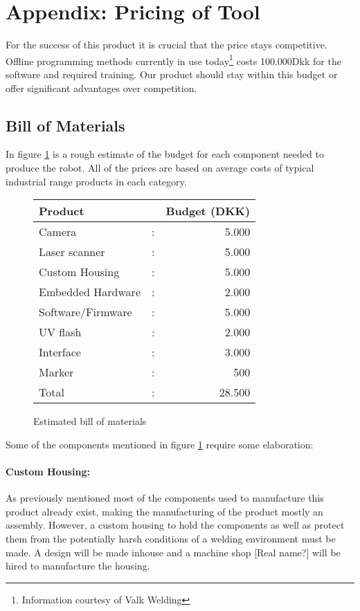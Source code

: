 \section{Appendix: Pricing of Tool}
\label{app:priceofProduct}
For the success of this product it is crucial that the price stays competitive. Offline programming methods currently in use today\footnote{Information courtesy of Valk Welding} costs 100.000Dkk for the software and required training. Our product should stay within this budget or offer significant advantages over competition.
\subsection{Bill of Materials}
In figure \ref{tab:BoM} is a rough estimate of the budget for each component needed to produce the robot. All of the prices are based on average costs of typical industrial range products in each category.  

\begin{figure}[h]
	\begin{center}
		\begin{tabular}{l c r}
		Product            & & Budget (DKK)\\
		\hline
		Camera 				& : & 5.000  \\
		Laser scanner		& : & 5.000 \\
		Custom Housing		& : & 5.000\\
		Embedded Hardware	& : & 2.000\\
		Software/Firmware	& : & 5.000\\
		UV flash			& : & 2.000\\
		Interface			& : & 3.000\\
		Marker				& : & 500\\[0.2cm]
		\hline
		Total				& : & 28.500\\ 
		\end{tabular}
	\end{center}
	\caption{Estimated bill of materials}
\label{tab:BoM}
\end{figure}
Some of the components mentioned in figure \ref{tab:BoM} require some elaboration:
\paragraph{Custom Housing:}
As previously mentioned most of the components used to manufacture this product already exist, making the manufacturing of the product mostly an assembly. However, a custom housing to hold the components as well as protect them from the potentially harsh conditions of a welding environment must be made. A design will be made inhouse and a machine shop [Real name?] will be hired to manufacture the housing.
